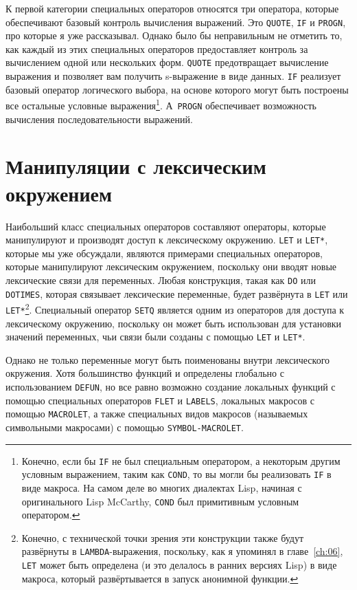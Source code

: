 К первой категории специальных операторов относятся три оператора, которые обеспечивают
базовый контроль вычисления выражений. Это \lstinline{QUOTE}, \lstinline{IF} и \lstinline{PROGN}, про
которые я уже рассказывал.  Однако было бы неправильным не отметить то, как каждый из этих
специальных операторов предоставляет контроль за вычислением одной или нескольких форм.
\lstinline{QUOTE} предотвращает вычисление выражения и позволяет вам получить s-выражение в
виде данных. \lstinline{IF} реализует базовый оператор логического выбора, на основе которого
могут быть построены все остальные условные выражения\footnote{Конечно, если бы \lstinline{IF}
  не был специальным оператором, а некоторым другим условным выражением, таким как
  \lstinline{COND}, то вы могли бы реализовать \lstinline{IF} в виде макроса.  На самом деле во
  многих диалектах Lisp, начиная с оригинального Lisp McCarthy, \lstinline{COND} был
  примитивным условным оператором.}\hspace{\footnotenegspace}.  А~\lstinline{PROGN} обеспечивает возможность вычисления
последовательности выражений.

\section{Манипуляции с лексическим окружением}

Наибольший класс специальных операторов составляют операторы, которые манипулируют и
производят доступ к лексическому окружению. \lstinline{LET} и \lstinline{LET*}, которые мы уже
обсуждали, являются примерами специальных операторов, которые манипулируют лексическим
окружением, поскольку они вводят новые лексические связи для переменных.  Любая
конструкция, такая как \lstinline{DO} или \lstinline{DOTIMES}, которая связывает лексические
переменные, будет развёрнута в \lstinline{LET} или \lstinline{LET*}\footnote{Конечно, с технической
  точки зрения эти конструкции также будут развёрнуты в \lstinline{LAMBDA}-выражения,
  поскольку, как я упоминял в главе~\ref{ch:06}, \lstinline{LET} может быть определена (и это
делалось в ранних версиях Lisp) в виде макроса, который развёртывается в запуск анонимной
функции.}\hspace{\footnotenegspace}. Специальный оператор \lstinline{SETQ} является одним из операторов для доступа к
лексическому окружению, поскольку он может быть использован для установки значений
переменных, чьи связи были созданы с помощью \lstinline{LET} и \lstinline{LET*}.

Однако не только переменные могут быть поименованы внутри лексического окружения.  Хотя
большинство функций и определены глобально с использованием \lstinline{DEFUN}, но все равно
возможно создание локальных функций с помощью специальных операторов \lstinline{FLET} и
\lstinline{LABELS}, локальных макросов с помощью \lstinline{MACROLET}, а также специальных видов
макросов (называемых символьными макросами) с помощью \lstinline{SYMBOL-MACROLET}.

